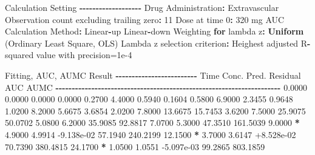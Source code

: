 \documentclass[
  12pt,
]{krantz}
\newenvironment{Shaded}{\begin{snugshade}}{\end{snugshade}}
\newcommand{\ControlFlowTok}[1]{\textcolor[rgb]{0.13,0.29,0.53}{\textbf{#1}}}
\newcommand{\DecValTok}[1]{\textcolor[rgb]{0.00,0.00,0.81}{#1}}
\newcommand{\FloatTok}[1]{\textcolor[rgb]{0.00,0.00,0.81}{#1}}
\newcommand{\KeywordTok}[1]{\textcolor[rgb]{0.13,0.29,0.53}{\textbf{#1}}}
\newcommand{\NormalTok}[1]{#1}
\newcommand{\OperatorTok}[1]{\textcolor[rgb]{0.81,0.36,0.00}{\textbf{#1}}}
\newcommand{\StringTok}[1]{\textcolor[rgb]{0.31,0.60,0.02}{#1}}
\begin{document}
\begin{Shaded}
\begin{Highlighting}[]
\NormalTok{Calculation Setting}
\OperatorTok{{-}{-}{-}{-}{-}{-}{-}{-}{-}{-}{-}{-}{-}{-}{-}{-}{-}{-}{-}}
\NormalTok{Drug Administration}\OperatorTok{:}\StringTok{ }\NormalTok{Extravascular}
\NormalTok{Observation count excluding trailing zero}\OperatorTok{:}\StringTok{ }\DecValTok{11}
\NormalTok{Dose at time }\DecValTok{0}\OperatorTok{:}\StringTok{ }\DecValTok{320}\NormalTok{ mg}
\NormalTok{AUC Calculation Method}\OperatorTok{:}\StringTok{ }\NormalTok{Linear}\OperatorTok{{-}}\NormalTok{up Linear}\OperatorTok{{-}}\NormalTok{down}
\NormalTok{Weighting }\ControlFlowTok{for}\NormalTok{ lambda z}\OperatorTok{:}\StringTok{ }\KeywordTok{Uniform}\NormalTok{ (Ordinary Least Square, OLS)}
\NormalTok{Lambda z selection criterion}\OperatorTok{:}\StringTok{ }\NormalTok{Heighest adjusted R}\OperatorTok{{-}}\NormalTok{squared value with precision=}\FloatTok{1e{-}4}


\NormalTok{Fitting, AUC, AUMC Result}
\OperatorTok{{-}{-}{-}{-}{-}{-}{-}{-}{-}{-}{-}{-}{-}{-}{-}{-}{-}{-}{-}{-}{-}{-}{-}{-}{-}}
\StringTok{      }\NormalTok{Time         Conc.      Pred.   Residual       AUC       AUMC}
\OperatorTok{{-}{-}{-}{-}{-}{-}{-}{-}{-}{-}{-}{-}{-}{-}{-}{-}{-}{-}{-}{-}{-}{-}{-}{-}{-}{-}{-}{-}{-}{-}{-}{-}{-}{-}{-}{-}{-}{-}{-}{-}{-}{-}{-}{-}{-}{-}{-}{-}{-}{-}{-}{-}{-}{-}{-}{-}{-}{-}{-}{-}{-}{-}{-}{-}{-}{-}{-}{-}{-}}
\StringTok{     }\FloatTok{0.0000}       \FloatTok{0.0000}                           \FloatTok{0.0000}     \FloatTok{0.0000}
     \FloatTok{0.2700}       \FloatTok{4.4000}                           \FloatTok{0.5940}     \FloatTok{0.1604}
     \FloatTok{0.5800}       \FloatTok{6.9000}                           \FloatTok{2.3455}     \FloatTok{0.9648}
     \FloatTok{1.0200}       \FloatTok{8.2000}                           \FloatTok{5.6675}     \FloatTok{3.6854}
     \FloatTok{2.0200}       \FloatTok{7.8000}                          \FloatTok{13.6675}    \FloatTok{15.7453}
     \FloatTok{3.6200}       \FloatTok{7.5000}                          \FloatTok{25.9075}    \FloatTok{50.0702}
     \FloatTok{5.0800}       \FloatTok{6.2000}                          \FloatTok{35.9085}    \FloatTok{92.8817}
     \FloatTok{7.0700}       \FloatTok{5.3000}                          \FloatTok{47.3510}   \FloatTok{161.5039}
     \FloatTok{9.0000} \OperatorTok{*}\StringTok{     }\FloatTok{4.9000}     \FloatTok{4.9914} \FloatTok{{-}9.138e{-}02}    \FloatTok{57.1940}   \FloatTok{240.2199}
    \FloatTok{12.1500} \OperatorTok{*}\StringTok{     }\FloatTok{3.7000}     \FloatTok{3.6147} \FloatTok{+8.528e{-}02}    \FloatTok{70.7390}   \FloatTok{380.4815}
    \FloatTok{24.1700} \OperatorTok{*}\StringTok{     }\FloatTok{1.0500}     \FloatTok{1.0551} \FloatTok{{-}5.097e{-}03}    \FloatTok{99.2865}   \FloatTok{803.1859}


\end{Highlighting}
\end{Shaded}
\end{document}
